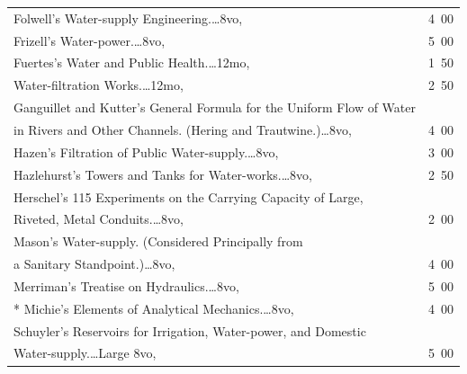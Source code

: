 \documentclass[a4paper,12pt]{book}[2004/02/16]
\theoremstyle{ilemma}
\theoremstyle{itheorem}
\theoremstyle{iother}
\theoremstyle{icorollary}
\theoremstyle{numcorollary}
\theoremstyle{idefinition}
\begin{document}
\begin{longtable}{@{}l@{ }r@{}}


Folwell's Water-supply Engineering.\dotfill\ldots 8vo, &4\ 00\\

Frizell's Water-power.\dotfill\ldots 8vo, &5\ 00\\

Fuertes's Water and Public Health.\dotfill\ldots 12mo, &1\ 50\\

\nopagebreak

\indent Water-filtration Works.\dotfill\ldots 12mo, &2\ 50\\

Ganguillet and Kutter's General Formula for the Uniform Flow of Water\\

\nopagebreak

\indent\indent in Rivers and Other Channels. (Hering and
Trautwine.)\dotfill\ldots 8vo, &4\ 00\\

Hazen's Filtration of Public Water-supply.\dotfill\ldots 8vo, &3\ 00\\

Hazlehurst's Towers and Tanks for Water-works.\dotfill\ldots 8vo, &2\ 50\\

Herschel's 115 Experiments on the Carrying Capacity of Large, \\

\nopagebreak

\indent\indent Riveted, Metal Conduits.\dotfill\ldots 8vo, &2\ 00\\

Mason's Water-supply. (Considered Principally from\\

\nopagebreak

\indent\indent a Sanitary Standpoint.)\dotfill\ldots 8vo, &4\ 00\\

Merriman's Treatise on Hydraulics.\dotfill\ldots 8vo, &5\ 00\\

* Michie's Elements of Analytical Mechanics.\dotfill\ldots 8vo, &4\ 00\\

Schuyler's Reservoirs for Irrigation, Water-power, and Domestic\\

\nopagebreak

\indent\indent Water-supply.\dotfill\ldots Large 8vo, &5\ 00\\


\end{longtable}
\end{document}
